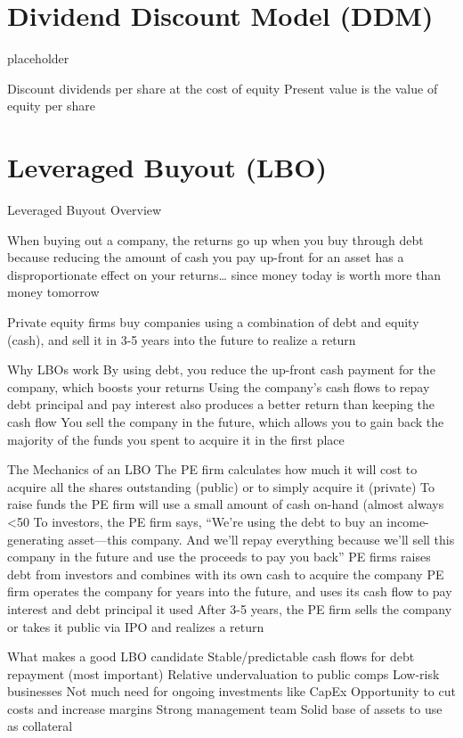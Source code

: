 \documentclass[10pt]{article}
\begin{document}
\section{Dividend Discount Model (DDM)}

  \begin{core}{placeholder}

    Discount dividends per share at the cost of equity
    Present value is the value of equity per share


  \end{core}

\section{Leveraged Buyout (LBO)}

  \begin{core}{Leveraged Buyout Overview}

    When buying out a company, the returns go up when you buy through debt because reducing the amount of cash you pay up-front for an asset has a disproportionate effect on your returns… since money today is worth more than money tomorrow

    Private equity firms buy companies using a combination of debt and equity (cash), and sell it in 3-5 years into the future to realize a return

    Why LBOs work
    By using debt, you reduce the up-front cash payment for the company, which boosts your returns
    Using the company’s cash flows to repay debt principal and pay interest also produces a better return than keeping the cash flow
    You sell the company in the future, which allows you to gain back the majority of the funds you spent to acquire it in the first place

    The Mechanics of an LBO
    The PE firm calculates how much it will cost to acquire all the shares outstanding (public) or to simply acquire it (private)
    To raise funds the PE firm will use a small amount of cash on-hand (almost always <50%
    To investors, the PE firm says, “We’re using the debt to buy an income-generating asset—this company. And we’ll repay everything because we’ll sell this company in the future and use the proceeds to pay you back”
    PE firms raises debt from investors and combines with its own cash to acquire the company
    PE firm operates the company for years into the future, and uses its cash flow to pay interest and debt principal it used
    After 3-5 years, the PE firm sells the company or takes it public via IPO and realizes a return

    What makes a good LBO candidate
    Stable/predictable cash flows for debt repayment (most important)
    Relative undervaluation to public comps
    Low-risk businesses
    Not much need for ongoing investments like CapEx
    Opportunity to cut costs and increase margins
    Strong management team
    Solid base of assets to use as collateral

  \end{core}
\end{document}
